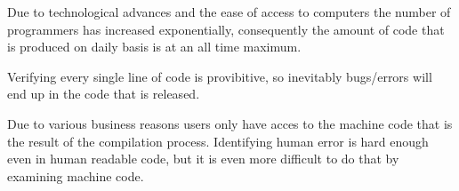 Due to technological advances and the ease of access to computers the number
of programmers has increased exponentially, consequently the amount of code
that is produced on daily basis is at an all time maximum.

Verifying every single line of code is provibitive, so inevitably bugs/errors
will end up in the code that is released.

Due to various business reasons users only have acces to the machine code that
is the result of the compilation process. Identifying human error is hard
enough even in human readable code, but it is even more difficult to do that
by examining machine code.

